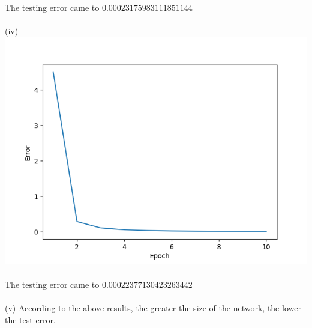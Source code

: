 \documentclass{article}
\begin{document}
The testing error came to $0.00023175983111851144$\\ \\
(iv)\includegraphics[scale=0.5]{Figure_3.png}\\ \\
The testing error came to $0.00022377130423263442$\\ \\
(v) According to the above results, the greater the size of the network, the lower the test error.
\end{document}
